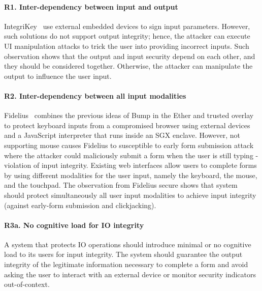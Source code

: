 \paragraph{R1. Inter-dependency between input and output} 
IntegriKey~\cite{IntegriKey} use external embedded devices to sign input parameters. However, such solutions do not support output integrity; hence, the attacker can execute UI manipulation attacks to trick the user into providing incorrect inputs. Such observation shows that the output and input security depend on each other, and they should be considered together. Otherwise, the attacker can manipulate the output to influence the user input.

\paragraph{R2. Inter-dependency between all input modalities} 
Fidelius~\cite{Fidelius} combines the previous ideas of Bump in the Ether and trusted overlay to protect keyboard inputs from a compromised browser using external devices and a JavaScript interpreter that runs inside an SGX enclave. However, not supporting mouse causes Fidelius to susceptible to early form submission attack where the attacker could maliciously submit a form when the user is still typing - violation of input integrity. Existing web interfaces allow users to complete forms by using different modalities for the user input, namely the keyboard, the mouse, and the touchpad. The observation from Fidelius secure shows that system should protect simultaneously all user input modalities to achieve input integrity (against early-form submission and clickjacking).


\paragraph{R3a. No cognitive load for IO integrity} 
A system that protects IO operations should introduce minimal or no cognitive load to its users for input integrity.
The system should guarantee the output integrity of the legitimate information necessary to complete a form and avoid asking the user to interact with an external device or monitor security indicators out-of-context.




